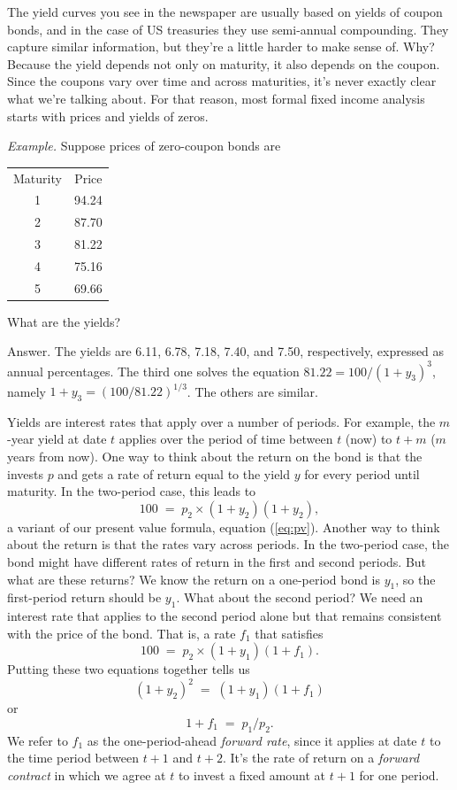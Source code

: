 \documentclass[letterpaper,12pt]{article}
\begin{document}
The yield curves you see in the newspaper are usually based on
yields of coupon bonds, and in the case of US treasuries they use
semi-annual compounding. They capture similar information, but
they're a little harder to make sense of.  Why?  Because the yield
depends not only on maturity, it also depends on the coupon. Since
the coupons vary over time and across maturities, it's never
exactly clear what we're talking about.  For that reason, most
formal fixed income analysis starts with prices and yields of
zeros.


{\em Example.} Suppose prices of zero-coupon bonds are
%
\begin{center}
\begin{tabular}{cc}
                    Maturity        &     Price         \\
                             1              &      94.24        \\
                             2              &      87.70        \\
                             3              &      81.22        \\
                             4              &      75.16        \\
                             5              &      69.66
\end{tabular}
\end{center}
%
What are the yields?

Answer.  The yields are 6.11, 6.78, 7.18, 7.40, and 7.50,
respectively, expressed as annual percentages.  The third one
solves the equation $ 81.22 = 100/(1+y_3)^3 $, namely $ 1 + y_3 =
(100/81.22)^{1/3} $.  The others are similar.



Yields are interest rates that apply over a number of periods. For
example, the $m$-year yield at date $t$ applies over the period of
time between $t$ (now) to $t+m$ ($m$ years from now).  One way to
think about the return on the bond is that the invests $p$ and
gets a rate of return equal to the yield $y$ for every period
until maturity.  In the two-period case, this leads to
\[
    100 \;=\; p_2 \times (1+y_2) (1+y_2) ,
\]
a variant of our present value formula, equation (\ref{eq:pv}).
Another way to think about the return is that the rates vary
across periods. In the two-period case, the bond might have
different rates of return in the first and second periods. But
what are these returns?  We know the return on a one-period bond
is $y_1$, so the first-period return should be $y_1$.  What about
the second period?  We need an interest rate that applies to the
second period alone but that remains consistent with the price of
the bond. That is, a rate $f_1$ that satisfies
\[
    100 \;=\; p_2 \times (1+y_1) (1+f_1) .
\]
Putting these two equations together tells us
\[
    (1+y_2)^2 \;=\; (1+y_1) (1+f_1)
\]
or
\[
    1+f_1 \;=\; p_1/p_2 .
\]
We refer to $f_1$ as the one-period-ahead {\it forward rate\/},
since it applies at date $t$ to the time period between $t+1$ and
$t+2$. It's the rate of return on a {\it forward contract\/} in
which we agree at $t$ to invest a fixed amount at $t+1$ for one
period.
\end{document}
